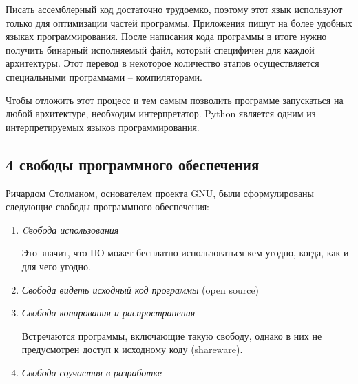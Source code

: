 Писать ассемблерный код достаточно трудоемко, поэтому этот язык используют только для оптимизации частей программы. Приложения пишут на более удобных языках программирования. После написания кода программы в итоге нужно получить бинарный исполняемый файл, который специфичен для каждой архитектуры. Этот перевод в некоторое количество этапов осуществляется специальными программами – компиляторами. 

Чтобы отложить этот процесс и тем самым позволить программе запускаться на любой архитектуре, необходим интерпретатор.
Python является одним из интерпретируемых языков программирования.

\subsection*{4 свободы программного обеспечения}

Ричардом Столманом, основателем проекта GNU, были сформулированы следующие свободы программного обеспечения:

\begin{enumerate}
	\item \emph{Cвобода использования}
	
	Это значит, что ПО может бесплатно использоваться кем угодно, когда, как и для чего угодно.
	
	\item \emph{Свобода видеть исходный код программы} (open source)
	
	\item \emph{Свобода копирования и распространения}
	
	Встречаются программы, включающие такую свободу, однако в них не предусмотрен доступ к исходному коду (shareware).
	
	\item \emph{Свобода соучастия в разработке}
\end{enumerate}